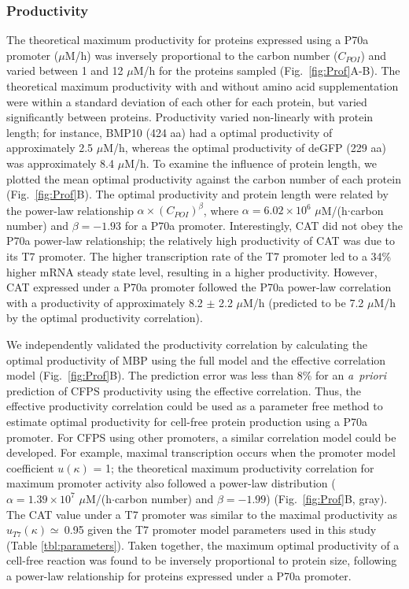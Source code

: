 \documentclass[journal=asbcd6,manuscript=article]{achemso}
\begin{document}

\subsubsection{Productivity}
The theoretical maximum productivity for proteins expressed using a P70a promoter ($\mu$M/h) was inversely proportional to the carbon number ($C_{POI}$) and varied between 1 and 12 $\mu$M/h for the proteins sampled (Fig.~\ref{fig:Prof}A-B).
The theoretical maximum productivity with and without amino acid supplementation were within a standard deviation of each other for each protein, but varied significantly between proteins.
Productivity varied non-linearly with protein length; for instance, BMP10 (424 aa) had a optimal productivity of approximately 2.5 $\mu$M/h, whereas the optimal productivity of deGFP (229 aa) was approximately 8.4 $\mu$M/h.
To examine the influence of protein length, we plotted the mean optimal productivity against the carbon number of each protein (Fig.~\ref{fig:Prof}B).
The optimal productivity and protein length were related by the power-law relationship $\alpha\times(C_{POI})^{\beta}$, where $\alpha = 6.02\times 10^{6}$ $\mu$M/(h$\cdot$carbon number) and $\beta=-1.93$ for a P70a promoter.
Interestingly, CAT did not obey the P70a power-law relationship; the relatively high productivity of CAT was due to its T7 promoter.
The higher transcription rate of the T7 promoter led to a 34\% higher mRNA steady state level, resulting in a higher productivity.
However, CAT expressed under a P70a promoter followed the P70a power-law correlation with a productivity of approximately 8.2 $\pm$ 2.2 $\mu$M/h (predicted to be 7.2 $\mu$M/h by the optimal productivity correlation).

We independently validated the productivity correlation by calculating the optimal productivity of MBP using the full model and the effective correlation model (Fig.~\ref{fig:Prof}B).
The prediction error was less than 8\% for an \emph{a~priori} prediction of CFPS productivity using the effective correlation.
Thus, the effective productivity correlation could be used as a parameter free method to estimate optimal productivity for cell-free protein production using a P70a promoter.
For CFPS using other promoters, a similar correlation model could be developed.
For example, maximal transcription occurs when the promoter model coefficient $u\left(\kappa\right)$ = 1; the theoretical maximum productivity correlation for maximum promoter activity also followed a power-law distribution ($\alpha = 1.39\times 10^{7}$ $\mu$M/(h$\cdot$carbon number) and $\beta=-1.99$) (Fig.~\ref{fig:Prof}B, gray).
The CAT value under a T7 promoter was similar to the maximal productivity as $u_{T7}\left(\kappa\right)\simeq~$0.95 given the T7 promoter model parameters used in this study (Table \ref{tbl:parameters}).
Taken together, the maximum optimal productivity of a cell-free reaction was found to be inversely proportional to protein size, following a power-law relationship for proteins expressed under a P70a promoter.
\end{document}
